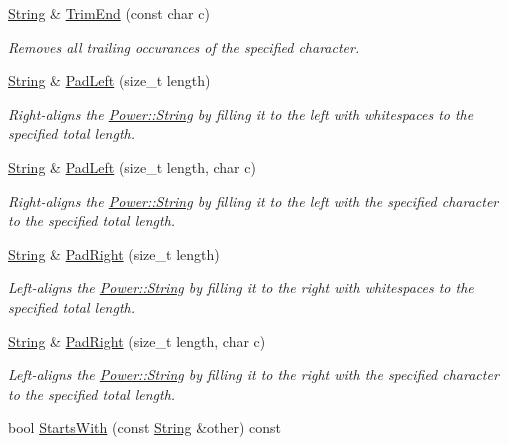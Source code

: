 \begin{DoxyCompactItemize}
\hyperlink{class_power_1_1_string}{String} \& \hyperlink{class_power_1_1_string_a7d7f493bed421a3919144c66fcb38121}{Trim\+End} (const char c)
\begin{DoxyCompactList}\small\item\em Removes all trailing occurances of the specified character. \end{DoxyCompactList}\item 
\hyperlink{class_power_1_1_string}{String} \& \hyperlink{class_power_1_1_string_a56ba1cfcfb79834e8267266a19b9a6f1}{Pad\+Left} (size\+\_\+t length)
\begin{DoxyCompactList}\small\item\em Right-\/aligns the \hyperlink{class_power_1_1_string}{Power\+::\+String} by filling it to the left with whitespaces to the specified total length. \end{DoxyCompactList}\item 
\hyperlink{class_power_1_1_string}{String} \& \hyperlink{class_power_1_1_string_aa194605077a9482279c88d7b3726c969}{Pad\+Left} (size\+\_\+t length, char c)
\begin{DoxyCompactList}\small\item\em Right-\/aligns the \hyperlink{class_power_1_1_string}{Power\+::\+String} by filling it to the left with the specified character to the specified total length. \end{DoxyCompactList}\item 
\hyperlink{class_power_1_1_string}{String} \& \hyperlink{class_power_1_1_string_af28370a40056ed8d7b38bdeb590e0bce}{Pad\+Right} (size\+\_\+t length)
\begin{DoxyCompactList}\small\item\em Left-\/aligns the \hyperlink{class_power_1_1_string}{Power\+::\+String} by filling it to the right with whitespaces to the specified total length. \end{DoxyCompactList}\item 
\hyperlink{class_power_1_1_string}{String} \& \hyperlink{class_power_1_1_string_ada653441d51531127346cfb8e5a7aa63}{Pad\+Right} (size\+\_\+t length, char c)
\begin{DoxyCompactList}\small\item\em Left-\/aligns the \hyperlink{class_power_1_1_string}{Power\+::\+String} by filling it to the right with the specified character to the specified total length. \end{DoxyCompactList}\item 
bool \hyperlink{class_power_1_1_string_ab4836da082c63ddf9f781eb80a10e5d1}{Starts\+With} (const \hyperlink{class_power_1_1_string}{String} \&other) const

\end{DoxyCompactItemize}

